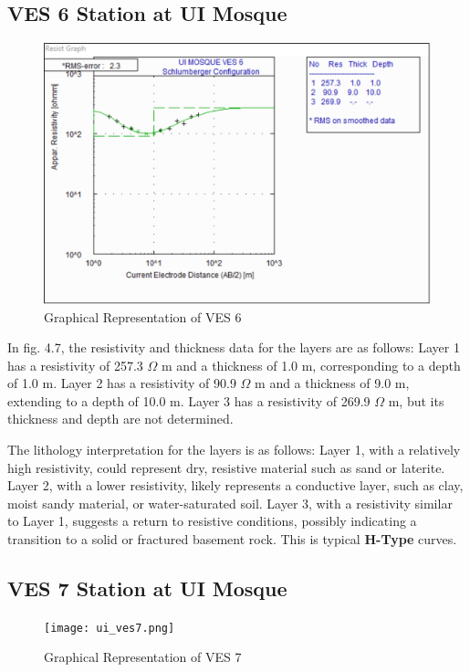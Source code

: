 \documentclass[12pt,a4paper]{report}
\begin{document}
\subsection{VES 6 Station at UI Mosque}

\begin{figure}[H]
    \centering
    \includegraphics[width=1.0\textwidth]{ui_ves6.png}
    \caption{Graphical Representation of VES 6}
    \label{fig:VES_6_Curve}
\end{figure}

In fig. 4.7, the resistivity and thickness data for the layers are as follows: Layer 1 has a resistivity of 257.3 $\Omega$ m and a thickness of 1.0 m, corresponding to a depth of 1.0 m. Layer 2 has a resistivity of 90.9 $\Omega$ m and a thickness of 9.0 m, extending to a depth of 10.0 m. Layer 3 has a resistivity of 269.9 $\Omega$ m, but its thickness and depth are not determined.

The lithology interpretation for the layers is as follows: Layer 1, with a relatively high resistivity, could represent dry, resistive material such as sand or laterite. Layer 2, with a lower resistivity, likely represents a conductive layer, such as clay, moist sandy material, or water-saturated soil. Layer 3, with a resistivity similar to Layer 1, suggests a return to resistive conditions, possibly indicating a transition to a solid or fractured basement rock. This is typical \textbf{H-Type} curves.

\subsection{VES 7 Station at UI Mosque}

\begin{figure}[H]
    \centering
    \texttt{[image: ui\_ves7.png]}
    \caption{Graphical Representation of VES 7}
    \label{fig:VES_7_Curve}
\end{figure}
\end{document}
